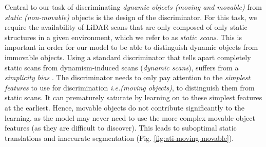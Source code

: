 \documentclass[10pt,twocolumn,letterpaper]{article}
\begin{document}
Central to our task of discriminating \textit{dynamic objects (moving and movable)} from \textit{static (non-movable)} objects is the design of the discriminator. For this task, we require the availability of LiDAR scans that are only composed of only static structures in a given environment, which we refer to as \textit{static scans}. This is important in order for our model to be able to distinguish dynamic objects from immovable objects. Using a standard discriminator that tells apart completely static scans from dynamism-induced scans (\textit{dynamic scans}), suffers from a \textit{simplicity bias} \cite{shah2020pitfalls}. The discriminator needs to only pay attention to the \textit{simplest features} to use for discrimination \textit{i.e.(moving objects)}, to distinguish them from static scans. It can prematurely saturate by learning on to these simplest features at the
earliest. Hence, movable objects do not contribute significantly to the learning. as the model may never need to use the more complex movable object features (as they are difficult to discover). This leads to  suboptimal static translations and inaccurate segmentation (Fig. \ref{fig:ati-moving-movable}).
\end{document}
